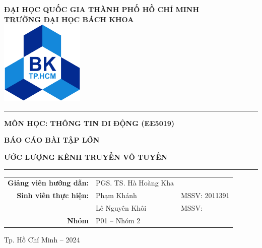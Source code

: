 \begin{titlepage}
    
    \begin{center}
    	\textbf{ĐẠI HỌC QUỐC GIA THÀNH PHỐ HỒ CHÍ MINH}\\[3pt]
    	\textbf{TRƯỜNG ĐẠI HỌC BÁCH KHOA}\\ 
    	
    	\vspace{1.5cm}
    	\includegraphics[width=4cm]{images/logo_BK.png}
    	\vspace{0.5cm}
    \end{center}
    
    \begin{center}
        \setlength{\parskip}{.5em}
        \par\noindent\rule{0.8\textwidth}{0.4pt}

        \textbf{{MÔN HỌC: THÔNG TIN DI ĐỘNG (EE5019)}}
        
        \textbf{{\large BÁO CÁO BÀI TẬP LỚN}}
    	    
        \textbf{{ƯỚC LƯỢNG KÊNH TRUYỀN VÔ TUYẾN}}
        \par\noindent\rule{0.8\textwidth}{0.4pt}
    \end{center}
    
    \vspace{1em}
    \begin{center}
        \renewcommand{\arraystretch}{1.5}
        \begin{tabular}{R{0.35} L{0.3} L{0.25}}
            \textbf{Giảng viên hướng dẫn:} & PGS. TS. Hà Hoàng Kha\\
            \textbf{Sinh viên thực hiện:} & Phạm Khánh & MSSV: 2011391\\
            & Lê Nguyên Khôi & MSSV: \\
            \textbf{Nhóm} & P01 -- Nhóm 2 & 
        \end{tabular}
    \end{center}
    
    \vfill
    \begin{center}
        Tp. Hồ Chí Minh -- 2024
    \end{center}
    \vspace{1em}
\end{titlepage}